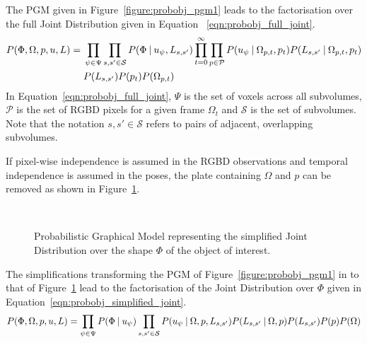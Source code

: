 The PGM given in Figure~\ref{figure:probobj_pgm1} leads to the
factorisation over the full Joint Distribution given in Equation
~\ref{eqn:probobj_full_joint}.
\begin{equation}
  \label{eqn:probobj_full_joint}
  \begin{split}
    P(\Phi, \Omega, p, u, L) ={}&
    \prod_{\psi \in \Psi}\prod_{s, s' \in \mathcal{S}}
    P(\Phi \:\vert\: u_{\psi}, L_{s, s'}) 
    \prod_{t=0}^{\infty}\prod_{p \in \mathcal{P}}
    P(u_{\psi} \:\vert\: \Omega_{p, t}, p_{t})
    P(L_{s, s'} \:\vert\: \Omega_{p, t}, p_{t})\\
    & P(L_{s, s'})P(p_{t})P(\Omega_{p, t})
  \end{split}
\end{equation}
In Equation~\ref{eqn:probobj_full_joint}, \( \Psi \) is the set of voxels
across all subvolumes, \(\mathcal{P}\) is the set of RGBD pixels for a given 
frame \(\Omega_{t}\) and \(\mathcal{S}\) is the set of subvolumes. Note that the 
notation \(s, s' \in \mathcal{S}\) refers to pairs of adjacent, overlapping 
subvolumes.

If pixel-wise independence is assumed in the RGBD observations and temporal
independence is assumed in the poses, the plate containing \( \Omega \) and \(p\) can
be removed as shown in Figure~\ref{figure:probobj_pgm2}.
\begin{figure}[!htbp]
  \centering
  \caption[Probabilistic Object Reconstruction Formulation II]
  {Probabilistic Graphical Model representing the simplified Joint
    Distribution over the shape \(\Phi\) of the object of interest.}
~\label{figure:probobj_pgm2}
\end{figure}

The simplifications transforming the PGM of Figure~\ref{figure:probobj_pgm1} in to
that of Figure~\ref{figure:probobj_pgm2} lead to the factorisation of the
Joint Distribution over \(\Phi\) given in Equation~\ref{eqn:probobj_simplified_joint}.
\begin{equation}
  \label{eqn:probobj_simplified_joint}
  P(\Phi, \Omega, p, u, L) = 
  \prod_{\psi \in \Psi}P(\Phi \:\vert\: u_{\psi})
  \prod_{s, s' \in \mathcal{S}}P(u_{\psi} \:\vert\: \Omega, p, L_{s, s'})
  P(L_{s, s'} \:\vert\: \Omega, p) P(L_{s, s'})P(p)P(\Omega)
\end{equation}

